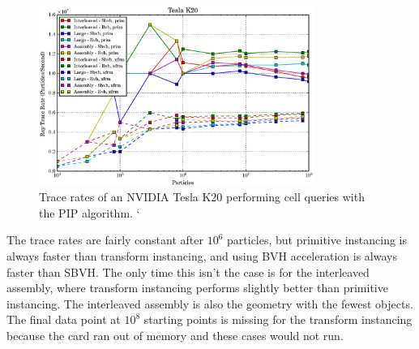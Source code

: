 \begin{figure}[h!] 
  \centering
    \includegraphics[width=0.8\textwidth]{graphics/prelim_optix_k20.eps}
     \caption{Trace rates of an NVIDIA Tesla K20 performing cell queries with the PIP algorithm. `\label{prelim_optix_k20} }
\end{figure}

The trace rates are fairly constant after $10^6$ particles, but primitive instancing is always faster than transform instancing, and using BVH acceleration is always faster than SBVH.  The only time this isn't the case is for the interleaved assembly, where transform instancing performs slightly better than primitive instancing.  The interleaved assembly is also the geometry with the fewest objects.  The final data point at $10^8$ starting points is missing for the transform instancing because the card ran out of memory and these cases would not run.




